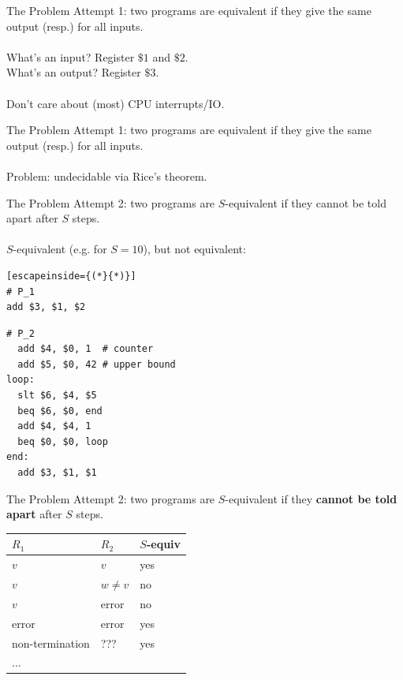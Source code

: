 \documentclass[pdf]{beamer}
\begin{document}
\begin{frame}{The Problem}
Attempt 1: two programs are equivalent if they give the same output (resp.) for all inputs.
\pause
\\~\\
What's an input?
\pause
Register $\$1$ and $\$2$.
\pause
\\
What's an output?
\pause
Register $\$3$. 
\pause
\\~\\
Don't care about (most) CPU interrupts/IO.
\end{frame}

\begin{frame}{The Problem}
Attempt 1: two programs are equivalent if they give the same output (resp.) for all inputs.
\pause
\\~\\
Problem: undecidable via Rice's theorem.
\end{frame}

\begin{frame}[fragile]{The Problem}
Attempt 2: two programs are $S$-equivalent if they cannot be told apart after $S$ steps.
\pause
\\~\\
$S$-equivalent (e.g. for $S = 10$), but not equivalent:
\begin{multicols}{2}
\begin{lstlisting}[escapeinside={(*}{*)}]
# P_1
add $3, $1, $2
\end{lstlisting}
\vfill\null
\columnbreak
\begin{lstlisting}
# P_2
  add $4, $0, 1  # counter
  add $5, $0, 42 # upper bound
loop:
  slt $6, $4, $5 
  beq $6, $0, end
  add $4, $4, 1
  beq $0, $0, loop
end:
  add $3, $1, $1  
\end{lstlisting}
\end{multicols}
\end{frame}

\begin{frame}{The Problem}
Attempt 2: two programs are $S$-equivalent if they \textbf{cannot be told apart} after $S$ steps.
\vspace{1cm}

\begin{tabular}{l | l | l}
$R_1$ & $R_2$ & $S$-equiv \\
\hline
\pause
$v$ & $v$ & yes \\
\pause
$v$ & $w \neq v$ & no \\
\pause
$v$ & error & no \\
\pause
error & error & yes \\
\pause
non-termination & ??? & yes \\
$\ldots$

\end{tabular}
\end{frame}
\end{document}

